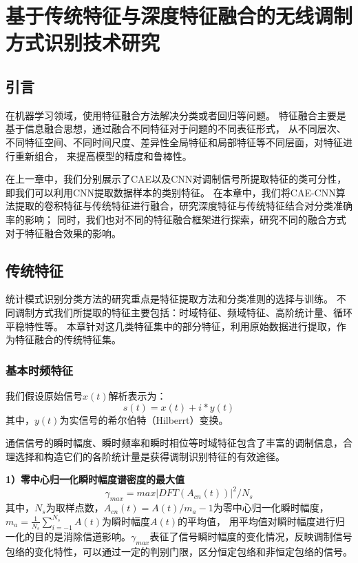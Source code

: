 \chapter{基于传统特征与深度特征融合的无线调制方式识别技术研究}
\section{引言}
在机器学习领域，使用特征融合方法解决分类或者回归等问题。
特征融合主要是基于信息融合思想，通过融合不同特征对于问题的不同表征形式，
从不同层次、不同特征空间、不同时间尺度、差异性全局特征和局部特征等不同层面，对特征进行重新组合，
来提高模型的精度和鲁棒性。\par

在上一章中，我们分别展示了CAE以及CNN对调制信号所提取特征的类可分性，即我们可以利用CNN提取数据样本的类别特征。
在本章中，我们将CAE-CNN算法提取的卷积特征与传统特征进行融合，研究深度特征与传统特征结合对分类准确率的影响；
同时，我们也对不同的特征融合框架进行探索，研究不同的融合方式对于特征融合效果的影响。\par

\section{传统特征}

统计模式识别分类方法的研究重点是特征提取方法和分类准则的选择与训练。
不同调制方式我们所提取的特征主要包括：时域特征、频域特征、高阶统计量、循环平稳特性等。
本章针对这几类特征集中的部分特征，利用原始数据进行提取，作为特征融合的传统特征集。\par

\subsection{基本时频特征}

我们假设原始信号$x(t)$解析表示为：
\begin{equation}
\label{eqt_4_1}
s(t)=x(t)+i*y(t)
\end{equation}
其中，$y(t)$为实信号的希尔伯特（Hilberrt）变换。\par

通信信号的瞬时幅度、瞬时频率和瞬时相位等时域特征包含了丰富的调制信息，合理选择和构造它们的各阶统计量是获得调制识别特征的有效途径。\par

\textbf{1）零中心归一化瞬时幅度谱密度的最大值}
\begin{equation}
\label{eqt_4_2}
\gamma_{max}=max|DFT(A_{cn}(t))|^{2}/N_s
\end{equation}
其中，$N_s$为取样点数，$A_{cn}(t)=A(t)/m_a-1$为零中心归一化瞬时幅度，
$m_a=\frac{1}{N_s}\sum_{i=-1}^{N_s}A(t)$为瞬时幅度$A(t)$的平均值，
用平均值对瞬时幅度进行归一化的目的是消除信道影响。$\gamma_{max}$表征了信号瞬时幅度的变化情况，反映调制信号包络的变化特性，可以通过一定的判别门限，区分恒定包络和非恒定包络的信号。


